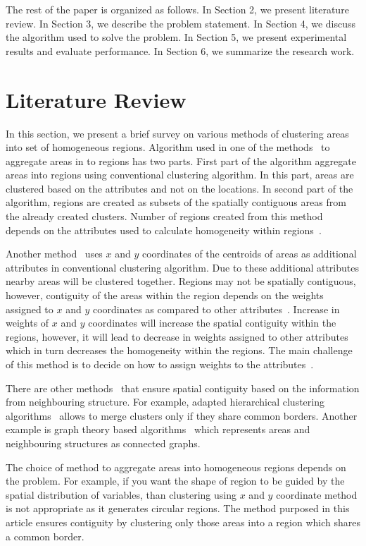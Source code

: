 \documentclass[conference]{IEEEtran}
\begin{document}
The rest of the paper is organized as follows. In Section 2, we present literature review. In Section 3, we describe the problem statement. In Section 4, we discuss the algorithm used to solve the problem. In Section 5, we present experimental results and evaluate performance. In Section 6, we summarize the research work.

\section{Literature Review}
In this section, we present a brief survey on various methods of clustering areas into set of homogeneous regions. Algorithm used in one of the methods~\cite{r4, r5} to aggregate areas in to regions has two parts. First part of the algorithm aggregate areas into regions using conventional clustering algorithm. In this part, areas are clustered based on the attributes and not on the locations. In second part of the algorithm, regions are created as subsets of the spatially contiguous areas from the already created clusters. Number of regions created from this method depends on the attributes used to calculate homogeneity within regions~\cite{r7}.

Another method~\cite{r6, r8} uses $x$ and $y$ coordinates of the centroids of
areas as additional attributes in conventional clustering algorithm. Due to
these additional attributes nearby areas will be clustered together. Regions may
not be spatially contiguous, however, contiguity of the areas within the region
depends on the weights assigned to $x$ and $y$ coordinates as compared to other
attributes~\cite{r24}. Increase in weights of $x$ and $y$ coordinates will
increase the spatial contiguity within the regions, however, it will lead to
decrease in weights assigned to other attributes which in turn decreases the
homogeneity within the regions. The main challenge of this method is to decide on how to assign weights to the attributes~\cite{r6, r16, r20}.

There are other methods~\cite{r7, r8, r14, r15, r18} that ensure spatial contiguity based on the information from neighbouring structure. For example, adapted hierarchical clustering algorithms~\cite{r11, r13, r22} allows to merge clusters only if they share common borders. Another example is graph theory based algorithms~\cite{r12, r17, r24} which represents areas and neighbouring structures as connected graphs.

The choice of method to aggregate areas into homogeneous regions depends on the problem. For example, if you want the shape of region to be guided by the spatial distribution of variables, than clustering using $x$ and $y$ coordinate method is not appropriate as it generates circular regions. The method purposed in this article ensures contiguity by clustering only those areas into a region which shares a common border.
\end{document}
